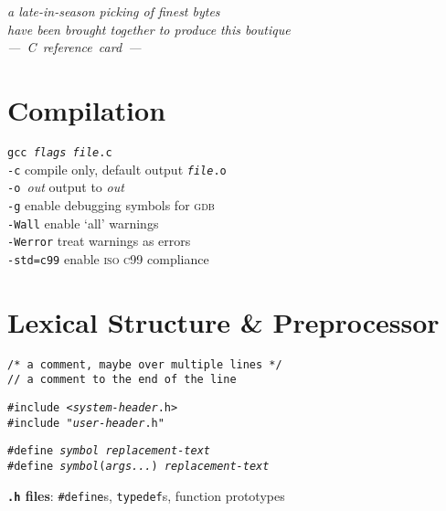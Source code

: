 \documentclass[8pt]{article}
\newcommand{\Cc}[1]{\texttt{#1}}
\newcommand{\cmt}[1]{\textcolor[gray]{.3}{\texttt{#1}}} %
\newcommand{\cpp}[1]{\textcolor{black!20!cyan}{\texttt{\##1}}} %
\newcommand{\kw}[1]{\textcolor{black!40!lime}{\texttt{#1}}} %
\newcommand{\quo}[1]{\textcolor{violet!80!black}{\texttt{#1}}} %
\newcommand{\opt}[1]{\textrm{\textit{#1}}} %
\newcommand{\leadingone}{a late-in-season picking of finest bytes}
\newcommand{\leadingtwo}{have been brought together to produce this boutique}
\begin{document}
\begin{multicols}{3}

\begin{center}{\rmfamily
\itshape\leadingone\\ \leadingtwo \\
\Huge ---~C~reference~card~--- }\\
\end{center}

\section*{Compilation}

\Cc{gcc \opt{flags} \opt{file}.c}\\
\hspace*{2.2em}\texttt{-c}\quad
    compile only, default output \Cc{\opt{file}.o}\\
\hspace*{2.2em}\texttt{-o~}\textit{out}\quad
    output to \opt{out}\\
\hspace*{2.2em}\texttt{-g}\quad
    enable debugging symbols for \textsc{gdb}\\
\hspace*{2.2em}\texttt{-Wall}\quad
    enable `all' warnings\\
\hspace*{2.2em}\texttt{-Werror}\quad
    treat warnings as errors\\
\hspace*{2.2em}\texttt{-std=c99}\quad
    enable \textsc{iso c99} compliance

\section*{Lexical Structure \& Preprocessor}

\Cc{\cmt{/* a comment, maybe over multiple lines */}}\\
\Cc{\cmt{// a comment to the end of the line}}

\Cc{\cpp{include} \quo{<\opt{system-header}.h>}}\\
\Cc{\cpp{include} \quo{"\opt{user-header}.h"}}

\Cc{\cpp{define} \opt{symbol} \opt{replacement-text}}\\
\Cc{\cpp{define} \opt{symbol}(\opt{args...}) \opt{replacement-text}}

\textbf{\texttt{.h} files}:
\cpp{define}s, \kw{typedef}s, function prototypes


\end{multicols}
\end{document}
